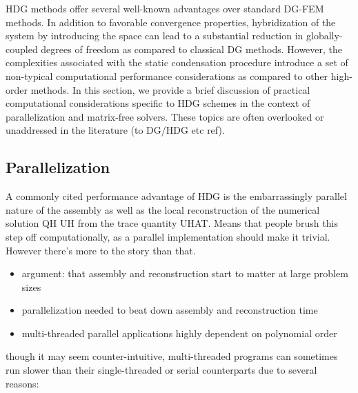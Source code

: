 HDG methods offer several well-known advantages over standard DG-FEM methods. 
In addition to favorable convergence properties, hybridization of the system by introducing the space  can lead to a substantial reduction in globally-coupled degrees of freedom as compared to classical DG methods.
However, the complexities associated with the static condensation procedure introduce a set of non-typical computational performance considerations as compared to other high-order methods.
In this section, we provide a brief discussion of practical computational considerations specific to HDG schemes in the context of parallelization and matrix-free solvers. These topics are often overlooked or unaddressed in the literature (to DG/HDG etc ref).

\subsection{Parallelization}%
\label{sec:computational:parallelization}

A commonly cited performance advantage of HDG is the embarrassingly parallel nature of the assembly as well as the local reconstruction of the numerical solution QH UH from the trace quantity UHAT.
Means that people brush this step off computationally, as a parallel implementation should make it trivial.
However there's more to the story than that.

\begin{itemize}
  \item argument: that assembly and reconstruction start to matter at large problem sizes
  \item parallelization needed to beat down assembly and reconstruction time
  \item multi-threaded parallel applications highly dependent on polynomial order
\end{itemize}

though it may seem counter-intuitive, multi-threaded programs can sometimes run slower than their single-threaded or serial counterparts due to several reasons:

